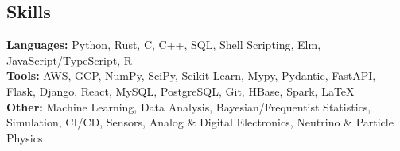 \documentclass[margin,line]{resume}
\begin{document}
\begin{resume}

    \section{\mysidestyle Skills}\vspace{0mm}%
    \textbf{Languages:} Python, Rust, C, C++, SQL, Shell Scripting, Elm, JavaScript/TypeScript, R
    \vspace{1mm}\\\vspace{0mm}%
    \textbf{Tools:} AWS, GCP, NumPy, SciPy, Scikit-Learn, Mypy, Pydantic, FastAPI, Flask, Django, React, MySQL, PostgreSQL, Git, HBase, Spark, \LaTeX
    \vspace{1mm}\\\vspace{0mm}%
    \textbf{Other:} Machine Learning, Data Analysis, Bayesian/Frequentist Statistics, Simulation, CI/CD, Sensors, Analog \& Digital Electronics, Neutrino \& Particle Physics%



\end{resume}
\end{document}
